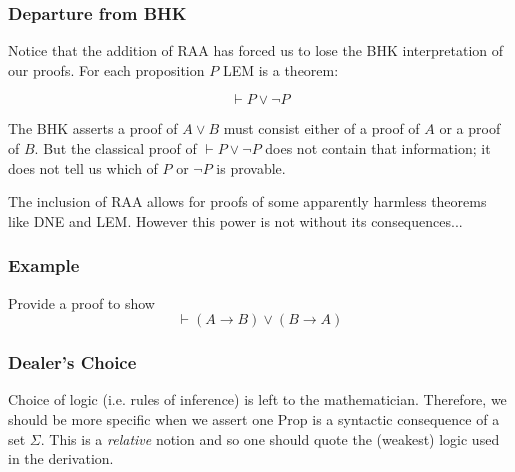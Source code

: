 \documentclass{beamer}
\begin{document}
\begin{frame}
  \frametitle{Departure from BHK}

    Notice that the addition of RAA has forced us to lose the BHK interpretation of our proofs. For each proposition $P$ LEM is a theorem: 

    $$ \vdash P \lor \lnot P$$

    The BHK asserts a proof of $A \lor B$ must consist either of a proof of $A$ or a proof of $B$. But the classical proof of $\vdash P \lor \lnot P$ does not contain that information; it does not tell us which of $P$ or $\lnot P$ is provable. 

	\vspace{5mm}

	The inclusion of RAA allows for proofs of some apparently harmless theorems like DNE and LEM. However this power is not without its consequences...

\end{frame}

\begin{frame}
	\frametitle{Example}
	Provide a proof to show $$ \vdash (A \to B) \lor (B \to A)$$
	\vspace{6cm}
	
	
\end{frame}

\begin{frame}
	\frametitle{Dealer's Choice}

	Choice of logic (i.e. rules of inference) is left to the mathematician. Therefore, we should be more specific when we assert one Prop is a syntactic consequence of a set $\Sigma$. This is a \emph{relative} notion and so one should quote the (weakest) logic used in the derivation. 

	\vspace{60mm}


\end{frame}
\end{document}
